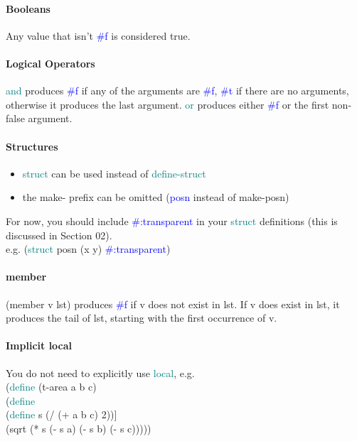 \documentclass[10pt,letter]{article}
\newcommand\tab[1][5mm]{\hspace*{#1}}
\begin{document}

\paragraph*{Booleans} 
Any value that isn't \textcolor{blue}{\#f} is considered true. 

\paragraph*{Logical Operators}
\textcolor{teal}{and} produces \textcolor{blue}{\#f} if any of the arguments are \textcolor{blue}{\#f}, \textcolor{blue}{\#t} if there are no arguments, otherwise it produces the last argument. \textcolor{teal}{or} produces either \textcolor{blue}{\#f} or the first non-false argument. 

\paragraph*{Structures}
\begin{itemize}
    \item \textcolor{teal}{struct} can be used instead of \textcolor{teal}{define-struct}
    \item the make- prefix can be omitted (\textcolor{blue}{posn} instead of make-posn)
\end{itemize}
For now, you should include \textcolor{blue}{\#:transparent} in your \textcolor{teal}{struct} definitions (this is discussed in Section 02). \\ e.g. 
(\textcolor{teal}{struct} posn (x y) \textcolor{blue}{\#:transparent})

\paragraph*{member}
(member v lst) produces \textcolor{blue}{\#f} if v does not exist in lst. If v does exist in lst, it produces the tail of lst, starting with the first occurrence of v.

\paragraph*{Implicit local}
You do not need to explicitly use \textcolor{teal}{local}, e.g.  \\ 
(\textcolor{teal}{define} (t-area a b c)\\
\tab(\textcolor{teal}{define}\\ 
\tab\tab{[}(\textcolor{teal}{define} s (/ (+ a b c) 2)){]}\\ 
\tab\tab(sqrt (* s (- s a) (- s b) (- s c)))))\\ 
\end{document}
